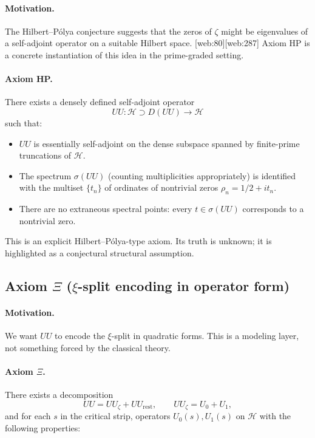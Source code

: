 \documentclass[11pt]{article}
\begin{document}
\paragraph{Motivation.}
The Hilbert--Pólya conjecture suggests that the zeros of $\zeta$ might be eigenvalues of a self-adjoint operator on a suitable Hilbert space. [web:80][web:287]  Axiom HP is a concrete instantiation of this idea in the prime-graded setting.

\paragraph{Axiom HP.}
There exists a densely defined self-adjoint operator
\begin{equation}
  UU: \mathcal{H}\supset D(UU) \to \mathcal{H}
\end{equation}
such that:
\begin{itemize}
  \item $UU$ is essentially self-adjoint on the dense subspace spanned by finite-prime truncations of $\mathcal{H}$.
  \item The spectrum $\sigma(UU)$ (counting multiplicities appropriately) is identified with the multiset $\{ t_n \}$ of ordinates of nontrivial zeros $\rho_n = 1/2 + i t_n$.
  \item There are no extraneous spectral points: every $t\in\sigma(UU)$ corresponds to a nontrivial zero.
\end{itemize}

This is an explicit Hilbert--Pólya-type axiom.  Its truth is unknown; it is highlighted as a conjectural structural assumption.

\subsection{Axiom $\Xi$ ($\xi$-split encoding in operator form)}

\paragraph{Motivation.}
We want $UU$ to encode the $\xi$-split in quadratic forms.  This is a modeling layer, not something forced by the classical theory.

\paragraph{Axiom $\Xi$.}
There exists a decomposition
\begin{equation}
  UU = UU_{\zeta} + UU_{\mathrm{rest}},\qquad UU_{\zeta} = U_0 + U_1,
\end{equation}
and for each $s$ in the critical strip, operators $U_0(s), U_1(s)$ on $\mathcal{H}$ with the following properties:
\end{document}
